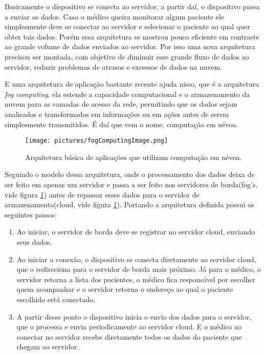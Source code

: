 \documentclass[12pt]{article}
\begin{document}
Basicamente o dispositivo se conecta ao servidor, a partir daí, o dispositivo passa a enviar os dados. Caso o médico queira monitorar algum paciente ele simplesmente deve se conectar ao servidor e selecionar o paciente ao qual quer obter tais dados. Porém essa arquitetura se mostrou pouco eficiente em contraste ao grande volume de dados enviados ao servidor. Por isso uma nova arquitetura precisou ser montada, com objetivo de diminuir esse grande fluxo de dados ao servidor, reduzir problemas de atrasos e excessos de dados na nuvem.

E uma arquitetura de aplicação bastante recente ajuda nisso, que é a arquitetura \textit{fog computing}, ela estende a capacidade computacional e o armazenamento da nuvem para as camadas de acesso da rede, permitindo que os dados sejam analisados e transformados em informações ou em ações antes de serem simplesmente transmitidos. É daí que vem o nome, computação em névoa.

\begin{figure}[!htb]
\centering
\texttt{[image: pictures/fogComputingImage.png]}
\caption{Arquitetura básica de aplicações que utilizam computação em névoa.}
\label{archFog}
\end{figure}

Seguindo o modelo dessa arquitetura, onde o processamento dos dados deixa de ser feito em apenas um servidor e passa a ser feito nos servidores de borda(fog's, vide figura \ref{archFog}) antes de repassar esses dados para o servidor de armazenamento(cloud, vide figura \ref{archFog}). Portando a arquitetura definida possui os seguintes passos:

\begin{enumerate}
\item Ao iniciar, o servidor de borda deve se registrar no servidor cloud, enviando seus dados.
\item Ao iniciar a conexão, o dispositivo se conecta diretamente ao servidor cloud, que o redireciona para o servidor de borda mais próximo. Já para o médico, o servidor retorna a lista dos pacientes, o médico fica responsável por escolher quem acompanhar e o servidor retorna o endereço ao qual o paciente escolhido está conectado.
\item A partir desse ponto o dispositivo inicia o envio dos dados para o servidor, que o processa e envia periodicamente ao servidor cloud. E o médico ao conectar no servidor recebe diretamente todos os dados do paciente que chegam ao servidor.
\end{enumerate}
\end{document}
